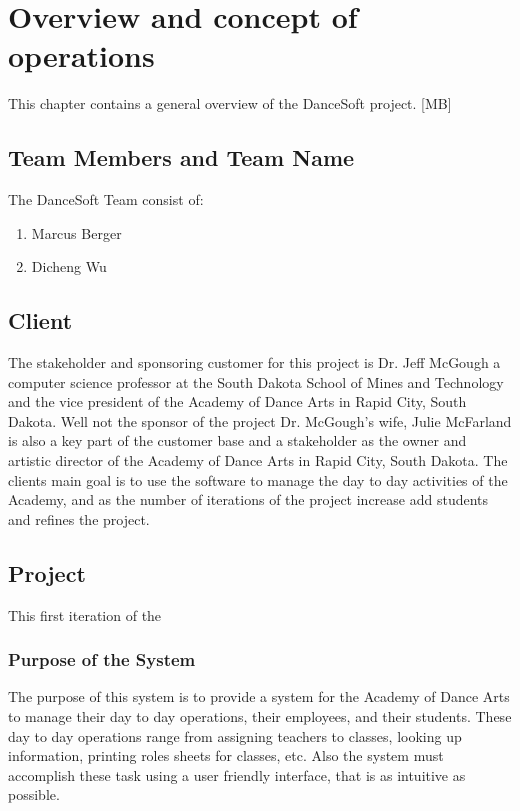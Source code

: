 

\chapter{Overview and concept of operations}

This chapter contains a  general overview of the DanceSoft project. [MB]

\section{Team Members and Team Name}

The DanceSoft Team consist of:
\begin{enumerate}
\item Marcus Berger
\item Dicheng Wu
\end{enumerate}


\section{Client}
The stakeholder and sponsoring customer for this project is Dr. Jeff McGough a computer science professor at the South Dakota School of Mines and Technology and the vice president of the Academy of Dance Arts in Rapid City, South Dakota.
Well not the sponsor of the project Dr. McGough's wife, Julie McFarland is also a key part of the customer base and a stakeholder as the owner and artistic director of the Academy of Dance Arts in Rapid City, South Dakota. The clients main goal is to use the software to manage the day to day activities of the Academy, and as the number of iterations of the project increase add students and refines the project. 



\section{Project}
This first iteration of the 

\subsection{Purpose of the System}
The purpose of this system is to provide a system for the Academy of Dance Arts to manage their day to day operations, their employees, and their students. These day to day operations range from assigning teachers to classes, looking up information, printing roles sheets for classes, etc.  Also the system must accomplish these task using a user friendly interface, that is as intuitive as possible.


